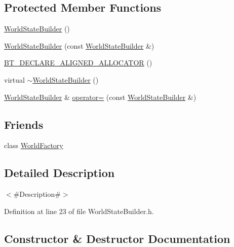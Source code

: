 \subsection*{Protected Member Functions}
\begin{DoxyCompactItemize}
\item 
\mbox{\hyperlink{classnjli_1_1_world_state_builder_a493f158507353962abf95cc07ae4b415}{World\+State\+Builder}} ()
\item 
\mbox{\hyperlink{classnjli_1_1_world_state_builder_a36d3be2c287ef79a893d1edd703f32d9}{World\+State\+Builder}} (const \mbox{\hyperlink{classnjli_1_1_world_state_builder}{World\+State\+Builder}} \&)
\item 
\mbox{\hyperlink{classnjli_1_1_world_state_builder_aa3dd8d7b48312dfa0baf6f6b6acf4746}{B\+T\+\_\+\+D\+E\+C\+L\+A\+R\+E\+\_\+\+A\+L\+I\+G\+N\+E\+D\+\_\+\+A\+L\+L\+O\+C\+A\+T\+OR}} ()
\item 
virtual \mbox{\hyperlink{classnjli_1_1_world_state_builder_aff9a1a80e2ef199ccb713b81a5539bc2}{$\sim$\+World\+State\+Builder}} ()
\item 
\mbox{\hyperlink{classnjli_1_1_world_state_builder}{World\+State\+Builder}} \& \mbox{\hyperlink{classnjli_1_1_world_state_builder_adbe45926b43aca70c642a3ac818c0783}{operator=}} (const \mbox{\hyperlink{classnjli_1_1_world_state_builder}{World\+State\+Builder}} \&)
\end{DoxyCompactItemize}
\subsection*{Friends}
\begin{DoxyCompactItemize}
\item 
class \mbox{\hyperlink{classnjli_1_1_world_state_builder_acb96ebb09abe8f2a37a915a842babfac}{World\+Factory}}
\end{DoxyCompactItemize}


\subsection{Detailed Description}
$<$\#\+Description\#$>$ 

Definition at line 23 of file World\+State\+Builder.\+h.



\subsection{Constructor \& Destructor Documentation}
\mbox{\label{classnjli_1_1_world_state_builder_a493f158507353962abf95cc07ae4b415}} 
